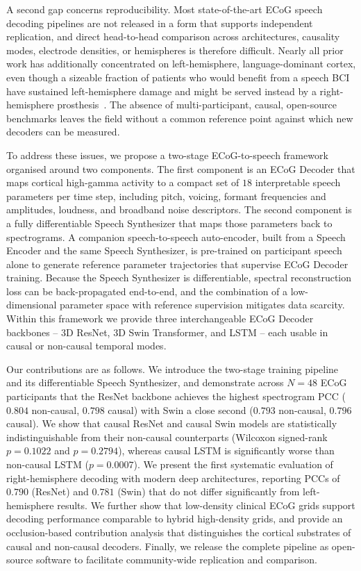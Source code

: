 \documentclass[11pt]{article}
\begin{document}
A second gap concerns reproducibility. Most state-of-the-art ECoG speech
decoding pipelines are not released in a form that supports independent
replication, and direct head-to-head comparison across architectures,
causality modes, electrode densities, or hemispheres is therefore
difficult. Nearly all prior work has additionally concentrated on
left-hemisphere, language-dominant cortex, even though a sizeable fraction
of patients who would benefit from a speech BCI have sustained
left-hemisphere damage and might be served instead by a right-hemisphere
prosthesis~\cite{lorach2023walking}. The absence of multi-participant,
causal, open-source benchmarks leaves the field without a common reference
point against which new decoders can be measured.

To address these issues, we propose a two-stage ECoG-to-speech framework
organised around two components. The first component is an ECoG Decoder
that maps cortical high-gamma activity to a compact set of $18$
interpretable speech parameters per time step, including pitch, voicing,
formant frequencies and amplitudes, loudness, and broadband noise
descriptors. The second component is a fully differentiable Speech
Synthesizer that maps those parameters back to spectrograms. A companion
speech-to-speech auto-encoder, built from a Speech Encoder and the same
Speech Synthesizer, is pre-trained on participant speech alone to generate
reference parameter trajectories that supervise ECoG Decoder training.
Because the Speech Synthesizer is differentiable, spectral reconstruction
loss can be back-propagated end-to-end, and the combination of a
low-dimensional parameter space with reference supervision mitigates data
scarcity. Within this framework we provide three interchangeable ECoG
Decoder backbones -- 3D ResNet, 3D Swin Transformer, and LSTM -- each
usable in causal or non-causal temporal modes.

Our contributions are as follows. We introduce the two-stage training
pipeline and its differentiable Speech Synthesizer, and demonstrate across
$N=48$ ECoG participants that the ResNet backbone achieves the highest
spectrogram PCC ($0.804$ non-causal, $0.798$ causal) with Swin a close
second ($0.793$ non-causal, $0.796$ causal). We show that causal ResNet
and causal Swin models are statistically indistinguishable from their
non-causal counterparts (Wilcoxon signed-rank $p=0.1022$ and $p=0.2794$),
whereas causal LSTM is significantly worse than non-causal LSTM
($p=0.0007$). We present the first systematic evaluation of
right-hemisphere decoding with modern deep architectures, reporting PCCs
of $0.790$ (ResNet) and $0.781$ (Swin) that do not differ significantly
from left-hemisphere results. We further show that low-density clinical
ECoG grids support decoding performance comparable to hybrid high-density
grids, and provide an occlusion-based contribution analysis that
distinguishes the cortical substrates of causal and non-causal decoders.
Finally, we release the complete pipeline as open-source software to
facilitate community-wide replication and comparison.
\end{document}
